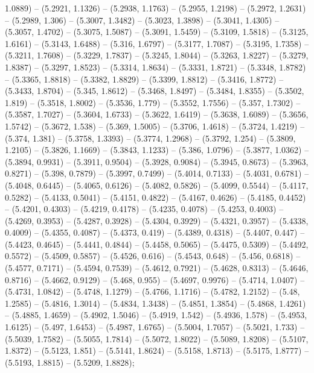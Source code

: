 1.0889) -- (5.2921, 1.1326) -- (5.2938, 1.1763) -- (5.2955, 1.2198) -- (5.2972, 1.2631) -- (5.2989, 1.306) -- (5.3007, 1.3482) -- (5.3023, 1.3898) -- (5.3041, 1.4305) -- (5.3057, 1.4702) -- (5.3075, 1.5087) -- (5.3091, 1.5459) -- (5.3109, 1.5818) -- (5.3125, 1.6161) -- (5.3143, 1.6488) -- (5.316, 1.6797) -- (5.3177, 1.7087) -- (5.3195, 1.7358) -- (5.3211, 1.7608) -- (5.3229, 1.7837) -- (5.3245, 1.8044) -- (5.3263, 1.8227) -- (5.3279, 1.8387) -- (5.3297, 1.8523) -- (5.3314, 1.8634) -- (5.3331, 1.8721) -- (5.3348, 1.8782) -- (5.3365, 1.8818) -- (5.3382, 1.8829) -- (5.3399, 1.8812) -- (5.3416, 1.8772) -- (5.3433, 1.8704) -- (5.345, 1.8612) -- (5.3468, 1.8497) -- (5.3484, 1.8355) -- (5.3502, 1.819) -- (5.3518, 1.8002) -- (5.3536, 1.779) -- (5.3552, 1.7556) -- (5.357, 1.7302) -- (5.3587, 1.7027) -- (5.3604, 1.6733) -- (5.3622, 1.6419) -- (5.3638, 1.6089) -- (5.3656, 1.5742) -- (5.3672, 1.538) -- (5.369, 1.5005) -- (5.3706, 1.4618) -- (5.3724, 1.4219) -- (5.374, 1.381) -- (5.3758, 1.3393) -- (5.3774, 1.2968) -- (5.3792, 1.254) -- (5.3809, 1.2105) -- (5.3826, 1.1669) -- (5.3843, 1.1233) -- (5.386, 1.0796) -- (5.3877, 1.0362) -- (5.3894, 0.9931) -- (5.3911, 0.9504) -- (5.3928, 0.9084) -- (5.3945, 0.8673) -- (5.3963, 0.8271) -- (5.398, 0.7879) -- (5.3997, 0.7499) -- (5.4014, 0.7133) -- (5.4031, 0.6781) -- (5.4048, 0.6445) -- (5.4065, 0.6126) -- (5.4082, 0.5826) -- (5.4099, 0.5544) -- (5.4117, 0.5282) -- (5.4133, 0.5041) -- (5.4151, 0.4822) -- (5.4167, 0.4626) -- (5.4185, 0.4452) -- (5.4201, 0.4303) -- (5.4219, 0.4178) -- (5.4235, 0.4078) -- (5.4253, 0.4003) -- (5.4269, 0.3953) -- (5.4287, 0.3928) -- (5.4304, 0.3929) -- (5.4321, 0.3957) -- (5.4338, 0.4009) -- (5.4355, 0.4087) -- (5.4373, 0.419) -- (5.4389, 0.4318) -- (5.4407, 0.447) -- (5.4423, 0.4645) -- (5.4441, 0.4844) -- (5.4458, 0.5065) -- (5.4475, 0.5309) -- (5.4492, 0.5572) -- (5.4509, 0.5857) -- (5.4526, 0.616) -- (5.4543, 0.648) -- (5.456, 0.6818) -- (5.4577, 0.7171) -- (5.4594, 0.7539) -- (5.4612, 0.7921) -- (5.4628, 0.8313) -- (5.4646, 0.8716) -- (5.4662, 0.9129) -- (5.468, 0.955) -- (5.4697, 0.9976) -- (5.4714, 1.0407) -- (5.4731, 1.0842) -- (5.4748, 1.1279) -- (5.4766, 1.1716) -- (5.4782, 1.2152) -- (5.48, 1.2585) -- (5.4816, 1.3014) -- (5.4834, 1.3438) -- (5.4851, 1.3854) -- (5.4868, 1.4261) -- (5.4885, 1.4659) -- (5.4902, 1.5046) -- (5.4919, 1.542) -- (5.4936, 1.578) -- (5.4953, 1.6125) -- (5.497, 1.6453) -- (5.4987, 1.6765) -- (5.5004, 1.7057) -- (5.5021, 1.733) -- (5.5039, 1.7582) -- (5.5055, 1.7814) -- (5.5072, 1.8022) -- (5.5089, 1.8208) -- (5.5107, 1.8372) -- (5.5123, 1.851) -- (5.5141, 1.8624) -- (5.5158, 1.8713) -- (5.5175, 1.8777) -- (5.5193, 1.8815) -- (5.5209, 1.8828);



